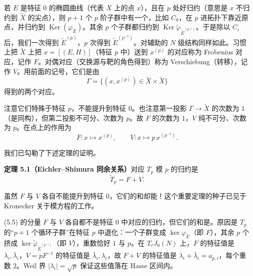 若 $E$ 是特征 $0$ 的椭圆曲线（代表 $X$ 上的点 $x$），且在 $p$ 处好归约（意思是 $x$ 不归约到 $\tilde{X}$ 的尖点），则 $p+1$ 个 $p$ 阶子群中有一个，比如 $C_0$，在 $p$ 进拓扑下靠近原点，并归约到 $\operatorname{Ker}(\varphi_{\tilde{E}})$。其余 $p$ 个子群都归约到 $\operatorname{Ker}\tilde{\varphi}_{\tilde{E}^{(p^{-1})}}$。于是除以 $C_i$ 后，我们一次得到 $\tilde{E}^{(p)}$，$p$ 次得到 $\tilde{E}^{(p^{-1})}$。对辅助的 $N$ 级结构同样如此。习惯上把 $\tilde{X}$ 上把 $x=[(E,H)]$（特征 $p$ 中）送到 $x^{(p)}$ 的对应称为 Frobenius 对应，记作 $F$。对偶对应（交换源与靶的角色得到）称为 Verschiebung（转移），记作 $V$。用前面的记号，它们是由
\begin{equation}\tag{5.3}\label{c5:eq:5.3}
\Gamma=\bigl\{(x,x^{(p)})\in\tilde{X}\times\tilde{X}\bigr\}
\end{equation}
得到的两个对应。

注意它们特殊于特征 $p$，不能提升到特征 $0$。也注意第一投影 $\Gamma\to\tilde{X}$ 的次数为 $1$（是同构），但第二投影不可分、次数为 $p$。故 $F$ 的次数为 $1$，$V$ 纯不可分、次数为 $p$。在点上的作用为
\begin{equation}\tag{5.4}\label{c5:eq:5.4}
F:x\longmapsto x^{(p)},\qquad V:x\longmapsto p\,x^{(p^{-1})}.
\end{equation}

我们已勾勒了下述定理的证明。

\par\medskip\noindent\textbf{定理 5.1（Eichler--Shimura 同余关系）}\quad 对应 $T_p$ 模 $p$ 的归约是
\begin{equation}\tag{5.5}\label{c5:eq:5.5}
\tilde{T}_p=F+V.
\end{equation}

虽然 $F$ 与 $V$ 各自不能提升到特征 $0$，它们的和却能！这个重要定理的种子已见于 Kronecker 关于模方程的工作。

\begin{annote}
(5.5) 的分量 $F$ 与 $V$ 各自都不是特征 $0$ 中对应的归约，但它们的和是。原因是 $T_p$ 的“$p+1$ 个循环子群”在特征 $p$ 中退化：一个子群变成 $\ker\varphi_{\tilde{E}}$（即 $F$），其余 $p$ 个挤成 $\ker\tilde{\varphi}_{\tilde{E}^{(p^{-1})}}$（即 $V$），重数恰好 $1$ 与 $p$。在 $T_\ell J_0(N)$ 上，$F$ 的特征值是 $\lambda_i,\bar\lambda_i$，$V=pF^{-1}$ 的特征值是 $\bar\lambda_i,\lambda_i$，故 $F+V$ 的特征值是 $\lambda_i+\bar\lambda_i=a_{p,i}$，每个重数 $2$。Weil 界 $|\lambda_i|=\sqrt{p}$ 保证这些值落在 Hasse 区间内。
\par\vspace{0.15em}{\raggedleft 【来源：Shimura《Introduction to the Arithmetic Theory of Automorphic Forms》第 7 章（A）；Deligne《Formes modulaires et représentations $\ell$-adiques》（A）】\par}
\end{annote}

